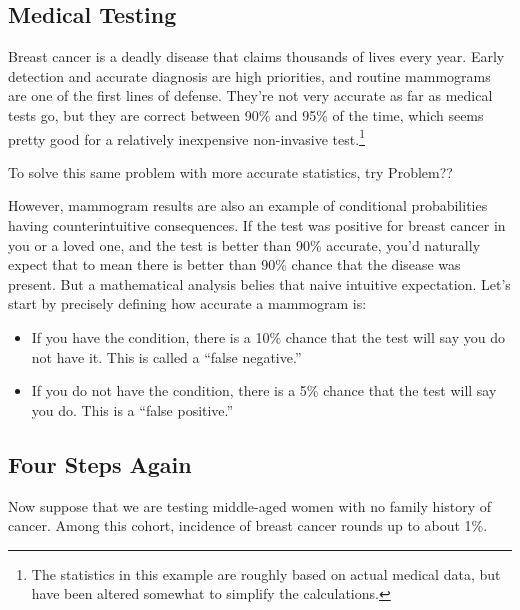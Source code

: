 \subsection{Medical Testing}\label{med_test-subsection}

Breast cancer is a deadly disease that claims thousands of lives every
year.  Early detection and accurate diagnosis are high priorities, and
routine mammograms are one of the first lines of defense.  They're not
very accurate as far as medical tests go, but they are correct between
90\% and 95\% of the time, which seems pretty good for a relatively
inexpensive non-invasive test.\footnote{The statistics in this example
  are roughly based on actual medical data, but have been altered
  somewhat to simplify the calculations.}
\begin{editingnotes}
  To solve this same problem
  with more accurate statistics, try Problem??
\end{editingnotes}
However, mammogram results are also an example of conditional
probabilities having counterintuitive consequences.  If the test was
positive for breast cancer in you or a loved one, and the test is
better than 90\% accurate, you'd naturally expect that to mean there
is better than 90\% chance that the disease was present.  But a
mathematical analysis belies that naive intuitive expectation.  Let's
start by precisely defining how accurate a mammogram is:
\begin{itemize}

\item If you have the condition, there is a 10\% chance that the test
  will say you do not have it.  This is called a ``false negative.''

\item If you do not have the condition, there is a 5\% chance that the
  test will say you do.  This is a ``false positive.''

\end{itemize}

\subsection{Four Steps Again}

Now suppose that we are testing middle-aged women with no family
history of cancer.  Among this cohort, incidence of breast cancer
rounds up to about 1\%.


